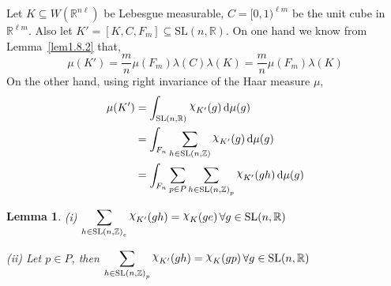 \documentclass[11pt]{article}
\newtheorem{lemma}[theorem]{Lemma}
\theoremstyle{definition}
\newcommand{\mychi}{\raisebox{2pt}{$\chi$}}
\begin{document}
Let $K \subseteq W(\mathbb{R}^{n\ell })$ be Lebesgue measurable, $C= [0, 1)^{\ell m}$ be the unit cube in $\mathbb{R}^{\ell m}$.
Also let $K'= [K,C,F_m] \subseteq \mathrm{SL}(n, \mathbb{R})$.
On one hand we know from Lemma~\ref{lem1.8.2} that,
\begin{equation}\label{eq1.15}
    \mu (K') = \frac{m}{n} \mu (F_m ) \lambda (C) \lambda (K)= \frac{m}{n}\mu (F_m)\lambda (K)
\end{equation}
On the other hand, using right invariance of the Haar measure $\mu$,
\begin{align}\label{eq1.16}
    \mu (K')&= \int_{\mathrm{SL}(n, \mathbb{R})}\mychi _{K'}(g) \, \mathrm{d} \mu (g) \nonumber \\
    &= \int_{F_n} \sum_{h \in \mathrm{SL}(n, \mathbb{Z})} \mychi _{K'}(g) \, \mathrm{d} \mu (g) \nonumber\\
    &= \int_{F_n} \sum_{p \in P} \sum_{h \in {\mathrm{SL}(n, \mathbb{Z})}_p} \mychi _{K'}(gh) \, \mathrm{d} \mu (g)
\end{align}
\begin{lemma}\label{lem1.8.3}
    (i) $\displaystyle\sum_{h \in {\mathrm{SL}(n, \mathbb{Z})}_e} \mychi _{K'}(gh) = \mychi _K(ge) \,\forall g \in \mathrm{SL}(n, \mathbb{R})$

    (ii) Let $p \in P$, then $\displaystyle\sum_{h \in {\mathrm{SL}(n, \mathbb{Z})}_p} \mychi _{K'}(gh) = \mychi _K(gp) \, \forall g \in \mathrm{SL}(n, \mathbb{R})$
\end{lemma}
\end{document}
